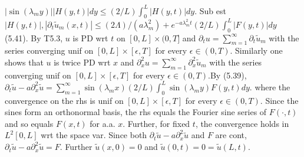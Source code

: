 $| \sin(\lambda_my)| |H(y,t)| dy \leq (2/L) \int_0^L  |H(y,t)| dy $. Sub est $|H(y,t)|, |\partial_t\tilde{u}_m(x,t)|\leq (2 \Lambda)/(a \lambda_m^2) + e^{-a\lambda_m^2t} (2/L) \int_0^L  |F(y,t)| dy$ (5.41). By T5.3, $u$ is PD wrt $t$ on $[0,L] \times (0, T]$ and $\partial_t u = \sum_{m=1}^{\infty}\partial_t \tilde{u}_m$ with the series converging unif on $[0,L] \times [\epsilon, T]$ for every $\epsilon \in (0,T)$. Similarly one shows that $u$ is twice PD wrt $x$ and $\partial_x^2 u = \sum_{m=1}^{\infty}\partial_x^2 \tilde{u}_m$ with the series converging unif on $[0,L] \times [\epsilon, T]$ for every $\epsilon \in (0,T)$.By (5.39), $\partial_t \tilde{u} - a \partial_x^2\tilde{u} = \sum_{m=1}^{\infty}\sin(\lambda_mx) (2/L) \int_0^L \sin(\lambda_my) F(y,t) dy$. where the convergence on the rhs is unif on $[0,L] \times [\epsilon, T]$ for every $\epsilon \in (0,T)$. Since the sines form an orthonormal basis, the rhs equals the Fourier sine series of $F(\cdot, t)$ and so equals $F(x,t)$ for a.a. $x$. Further, for fixed $t$, the convergence holds in $L^2[0,L]$ wrt the space var.  Since both $\partial_t \tilde{u} - a \partial_x^2\tilde{u} $ and $F$ are cont, $\partial_t \tilde{u} - a \partial_x^2\tilde{u} = F$. Further $\tilde{u}(x,0) = 0$ and $\tilde{u}(0,t) = 0 = \tilde{u}(L,t)$. 